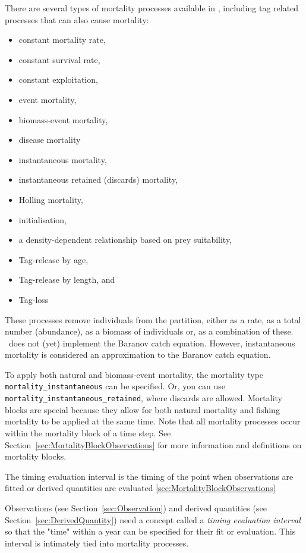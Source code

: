 There are several types of mortality processes available in \CNAME, including tag related processes that can also cause mortality:

\begin{itemize}
	\item constant mortality rate,
    \item constant survival rate,
	\item constant exploitation,
	\item event mortality,
	\item biomass-event mortality,
	\item disease mortality
	\item instantaneous mortality,
	\item instantaneous retained (discards) mortality,
	\item Holling mortality,
	\item initialisation,
	\item a density-dependent relationship based on prey suitability,
	\item Tag-release by age,
	\item Tag-release by length, and	
	\item Tag-loss
\end{itemize}

These processes remove individuals from the partition, either as a rate, as a total number (abundance), as a biomass of individuals or, as a combination of these. \CNAME\ does not (yet) implement the Baranov catch equation. However, instantaneous mortality is considered an approximation to the Baranov catch equation.

To apply both natural and biomass-event mortality, the mortality type \texttt{mortality\_instantaneous} can be specified. Or, you can use \texttt{mortality\_instantaneous\_retained}, where discards are allowed. Mortality blocks are special because they allow for both natural mortality and fishing mortality to be applied at the same time. Note that all mortality processes occur within the mortality block of a time step. See Section~\ref{sec:MortalityBlockObservations} for more information and definitions on mortality blocks.

\textbf{}

The timing evaluation interval is the timing of the point when observations are fitted or derived quantities are evaluated \ref{sec:MortalityBlockObservations}\label{sec:TimingEvaluationInterval}

Observations (see Section~\ref{sec:Observation})  and derived quantities (see Section~\ref{sec:DerivedQuantity}) need a concept called a \emph{timing evaluation interval} so that the "time" within a year can be specified for their fit or evaluation. This interval is intimately tied into mortality processes.

